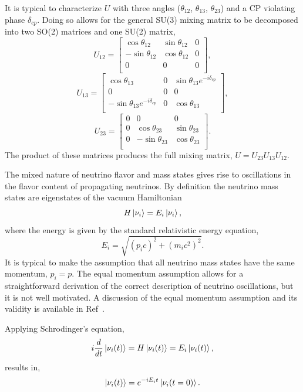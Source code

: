 It is typical to characterize $U$ with three angles
($\theta_{12}$, $\theta_{13}$, $\theta_{23}$) and a CP violating
phase $\delta_{cp}$. Doing so allows for the general SU(3) mixing matrix to
be decomposed into two SO(2) matrices and one SU(2) matrix,
$$U_{12} =
\begin{bmatrix}
    \cos\theta_{12} & \sin\theta_{12} & 0  \\
    -\sin\theta_{12}& \cos\theta_{12} & 0  \\
    0 & 0 & 0  \\
\end{bmatrix},
$$
$$
U_{13} =
\begin{bmatrix}
    \cos\theta_{13} & 0 & \sin\theta_{13}e^{-i\delta_{cp}}\\
    0 & 0 & 0  \\
    -\sin\theta_{13} e^{-i\delta_{cp}} & 0 & \cos\theta_{13}  \\
\end{bmatrix},
$$
$$
U_{23} =
\begin{bmatrix}
    0 & 0 & 0  \\
    0 & \cos\theta_{23} & \sin\theta_{23} \\
    0 & -\sin\theta_{23} & \cos\theta_{23}   \\
\end{bmatrix}.
$$
The product of these matrices produces the full mixing matrix,
$U = U_{23}U_{13}U_{12}$.

The mixed nature of neutrino flavor and mass states gives rise to oscillations
in the flavor content of propagating neutrinos.
By definition the neutrino mass states are eigenstates of the vacuum Hamiltonian
\begin{equation}
    H\ket{\nu_{i}} = E_{i}\ket{\nu_{i}}\text{,}
\end{equation}
where the energy is given by the standard relativistic energy equation,
\begin{equation}
    E_{i} = \sqrt{{(p_{i}c)}^{2} + {(m_{i}c^{2})}^2}\text{.}
\end{equation}
It is typical to make the assumption that all neutrino mass states have the same
momentum, $p_{i} = p$.
The equal momentum assumption allows for a straightforward derivation of the
correct description of neutrino oscillations, but it is not well motivated.
A discussion of the equal momentum assumption and its validity
is available in Ref~\citep{neutrino_osc_subtleties}.

Applying Schrodinger's equation,
\begin{equation}
    i\frac{d}{dt}\ket{\nu_{i}(t)} = H\ket{\nu_{i}(t)} = E_{i}\ket{\nu_{i}(t)}\text{,}
\label{eq:mass_state_evolution}
\end{equation}
results in,
\begin{equation}
    \ket{\nu_{i}(t)} = e^{-iE_{i}t}\ket{\nu_{i}(t=0)}\text{.}
    \label{eqn:mass_state_tevol}
\end{equation}

